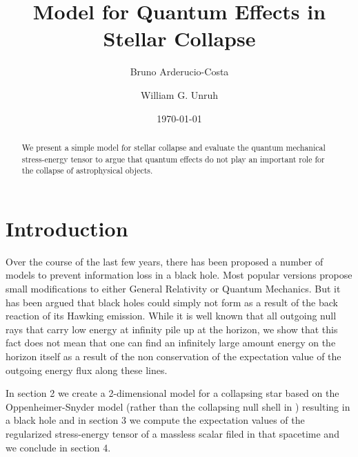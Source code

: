 \documentclass[reprint,amsmath,amssymb,aps,nofootinbib]{revtex4-1}
\begin{document}
\title{Model for Quantum Effects in Stellar Collapse}
\author{Bruno Arderucio-Costa}
\author{William G. Unruh}

\date{\today}


\begin{abstract}
We present a simple model for stellar collapse and evaluate the quantum mechanical stress-energy tensor to argue that quantum effects do not play an important role for the collapse of astrophysical objects.
\end{abstract}

\maketitle

\section{Introduction}
Over the course of the last few years, there has been proposed a number of models to prevent information loss in a black hole. Most popular versions propose small modifications to either General Relativity or Quantum Mechanics. But it has been argued \cite{LauraB,Laura, refB, Terno, ho} that black holes could simply not form as a result of the back reaction of its Hawking emission. While it is well known that all outgoing null rays that carry low energy at infinity pile up at the horizon, we show that this fact does not mean that one can find an infinitely large amount energy on the horizon itself as a result of the non conservation of the expectation value of the outgoing energy flux along these lines.

In section 2 we create a 2-dimensional model for a collapsing star based on the Oppenheimer-Snyder model (rather than the collapsing null shell in \cite{DFU}) resulting in a black hole and in section 3 we compute the expectation values of the regularized stress-energy tensor of a massless scalar filed in that spacetime and we conclude in section 4.
\end{document}
